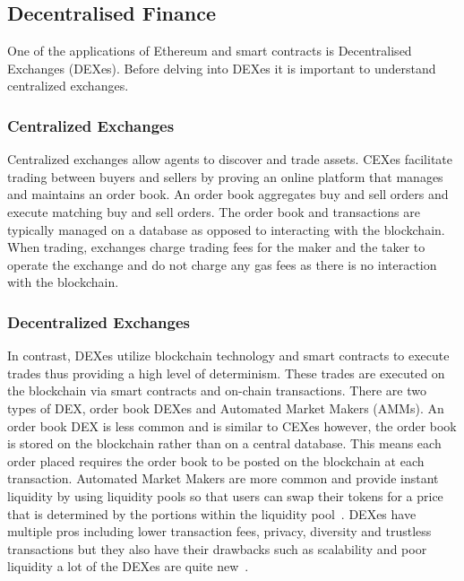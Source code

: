 \subsection{Decentralised Finance}
One of the applications of Ethereum and smart contracts is Decentralised Exchanges (DEXes). Before delving into DEXes it is important to understand centralized exchanges.

\subsubsection{Centralized Exchanges}
Centralized exchanges allow agents to discover and trade assets. CEXes facilitate trading between buyers and sellers by proving an online platform that manages and maintains an order book. An order book aggregates buy and sell orders and execute matching buy and sell orders. The order book and transactions are typically managed on a database as opposed to interacting with the blockchain. When trading, exchanges charge trading fees for the maker and the taker to operate the exchange and do not charge any gas fees as there is no interaction with the blockchain. 

\subsubsection{Decentralized Exchanges}
In contrast, DEXes utilize blockchain technology and smart contracts to execute trades thus providing a high level of determinism. These trades are executed on the blockchain via smart contracts and on-chain transactions. There are two types of DEX, order book DEXes and Automated Market Makers (AMMs). An order book DEX is less common and is similar to CEXes however, the order book is stored on the blockchain rather than on a central database. This means each order placed requires the order book to be posted on the blockchain at each transaction. Automated Market Makers are more common and provide instant liquidity by using liquidity pools so that users can swap their tokens for a price that is determined by the portions within the liquidity pool~\cite{DEXes}. DEXes have multiple pros including lower transaction fees, privacy, diversity and trustless transactions but they also have their drawbacks such as scalability and poor liquidity a lot of the DEXes are quite new~\cite{DEXvsCEX}.

